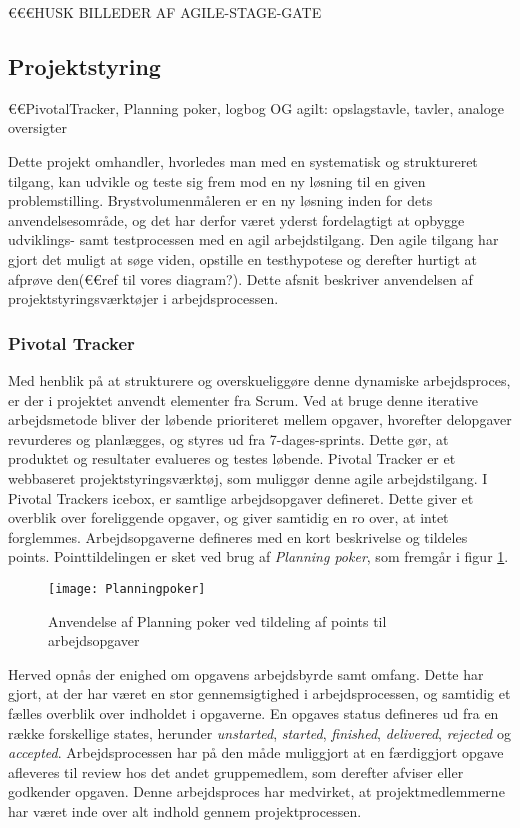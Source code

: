 	€€€HUSK BILLEDER AF AGILE-STAGE-GATE 
	
\subsection{Projektstyring}
	€€PivotalTracker, Planning poker, logbog OG agilt: opslagstavle, tavler, analoge oversigter
	
	Dette projekt omhandler, hvorledes man med en systematisk og struktureret tilgang, kan udvikle og teste sig frem mod en ny løsning til en given problemstilling. Brystvolumenmåleren er en ny løsning inden for dets anvendelsesområde, og det har derfor været yderst fordelagtigt at opbygge udviklings- samt testprocessen med en agil arbejdstilgang. Den agile tilgang har gjort det muligt at søge viden, opstille en testhypotese og derefter hurtigt at afprøve den(€€ref til vores diagram?). Dette afsnit beskriver anvendelsen af projektstyringsværktøjer i arbejdsprocessen. 
	\subsubsection{Pivotal Tracker}
	Med henblik på at strukturere og overskueliggøre denne dynamiske arbejdsproces, er der i projektet anvendt elementer fra Scrum. Ved at bruge denne iterative arbejdsmetode bliver der løbende prioriteret mellem opgaver, hvorefter delopgaver revurderes og planlægges, og styres ud fra 7-dages-sprints. Dette gør, at produktet og resultater evalueres og testes løbende. Pivotal Tracker er et webbaseret projektstyringsværktøj, som muliggør denne agile arbejdstilgang. I Pivotal Trackers icebox, er samtlige arbejdsopgaver defineret. Dette giver et overblik over foreliggende opgaver, og giver samtidig en ro over, at intet forglemmes. Arbejdsopgaverne defineres med en kort beskrivelse og tildeles points. Pointtildelingen er sket ved brug af \textit{Planning poker}, som fremgår i figur \ref{fig:planningpoker}. 
	
	\begin{figure}[htb]
	\centering
	\texttt{[image: Planningpoker]}
	\caption{Anvendelse af Planning poker ved tildeling af points til arbejdsopgaver}
	\label{fig:planningpoker}	
	\end{figure}
	
	Herved opnås der enighed om opgavens arbejdsbyrde samt omfang. Dette har gjort, at der har været en stor gennemsigtighed i arbejdsprocessen, og samtidig et fælles overblik over indholdet i opgaverne. En opgaves status defineres ud fra en række forskellige states, herunder \textit{unstarted}, \textit{started}, \textit{finished}, \textit{delivered}, \textit{rejected} og \textit{accepted}. Arbejdsprocessen har på den måde muliggjort at en færdiggjort opgave afleveres til review hos det andet gruppemedlem, som derefter afviser eller godkender opgaven. Denne arbejdsproces har medvirket, at projektmedlemmerne har været inde over alt indhold gennem projektprocessen.  
    
